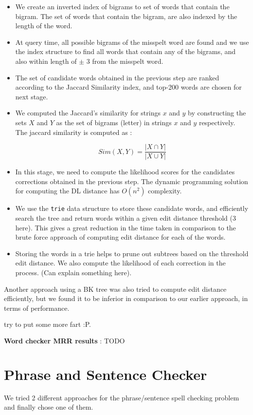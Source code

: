 \begin{flushleft}
\begin{itemize}
\item We create an inverted index of bigrams to set of words that contain the bigram. The set of words that contain the bigram, are also indexed by the length of the word. 
\item At query time, all possible bigrams of the misspelt word are found and we use the index structure to find all words that contain any of the bigrams, and also within length of $\pm$ 3 from the misspelt word. 
\item The set of candidate words obtained in the previous step are ranked according to the Jaccard Similarity index, and top-200 words are chosen for next stage.
\item We computed the Jaccard's similarity for strings $x$ and $y$ by constructing the sets $X$ and $Y$ as the set of bigrams (letter) in strings $x$ and $y$ respectively. The jaccard similarity is computed as :

\[Sim(X,Y) = \frac{|X \cap Y|}{|X \cup Y|} \] 

\item In this stage, we need to compute the likelihood scores for the candidates corrections obtained in the previous step. The dynamic programming solution for computing the DL distance has $O(n^2)$ complexity.
\item We use the \texttt{trie} data structure to store these candidate words, and efficiently search the tree and return words within a given edit distance threshold (3 here). This gives a great reduction in the time taken in comparison to the brute force approach of computing edit distance for each of the words.

\item Storing the words in a trie helps to prune out subtrees based on the threshold edit distance. We also compute the likelihood of each correction in the process. (Can explain something here).

\end{itemize}

Another approach using a BK tree was also tried to compute edit distance efficiently, but we found it to be inferior in comparison to our earlier approach, in terms of performance.

try to put some more fart :P.

\textbf{Word checker MRR results} : TODO
\end{flushleft}

\section{Phrase and Sentence Checker}
We tried 2 different approaches for the phrase/sentence spell checking problem and finally chose one of them.
